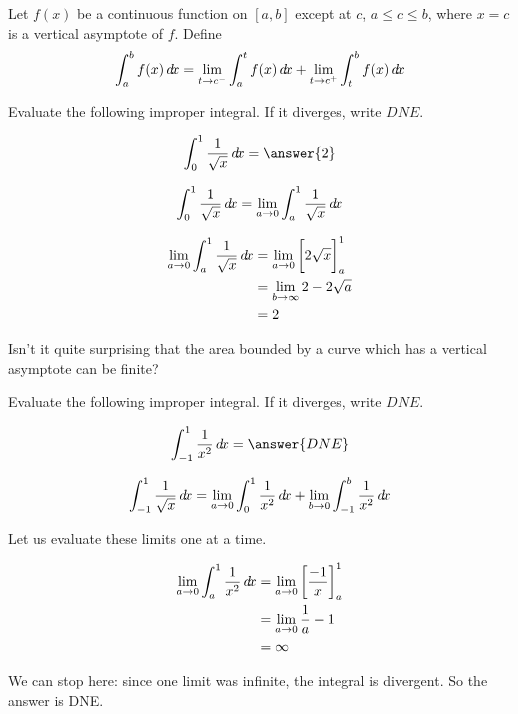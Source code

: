 \documentclass{ximera}
\begin{document}
\begin{definition}
Let $f(x)$ be a continuous function on $[a,b]$ except at $c$, $a\leq c\leq b$, where $x=c$ is a vertical asymptote of $f$. Define
\[
\int_a^b f(x)\mathop{}\!d\! x = \lim_{t\to c^-}\int_a^t f(x)\mathop{}\!d\! x + \lim_{t\to c^+}\int_t^b f(x)\mathop{}\!d\! x
\]
\end{definition}

\begin{example}	
	Evaluate the following improper integral.  If it diverges, write $DNE$.
	
	\[
	\int_{0}^1 \frac{1}{\sqrt{x}} \d x = \answer{2}
	\]
	
	\begin{hint}
		\[
		\int_{0}^1 \frac{1}{\sqrt{x}} \mathop{}\!d\! x = \lim_{a \to 0} \int_{a}^1 \frac{1}{\sqrt{x}} \mathop{}\!d\! x 
		\]
	\end{hint}
	
	\begin{hint}
		\begin{align*}
		 \lim_{a \to 0} \int_{a}^1 \frac{1}{\sqrt{x}} \mathop{}\!d\! x  &=  \lim_{a \to 0}  \bigg[ 2\sqrt{x} \bigg]_a^1 \\
		 	&=  \lim_{b \to \infty} 2-2\sqrt{a}\\
			&= 2
		\end{align*}
		\end{hint}
		
		\begin{feedback}
			Isn't it quite surprising that the area bounded by a curve which has a vertical asymptote can be finite?
		\end{feedback}
\end{example}

\begin{example}	
	Evaluate the following improper integral.  If it diverges, write $DNE$.
	
	\[
	\int_{-1}^1 \frac{1}{x^2} \d x = \answer{DNE}
	\]
	
	\begin{hint}
		\[
		\int_{-1}^1 \frac{1}{\sqrt{x}} \mathop{}\!d\! x = \lim_{a \to 0} \int_{0}^1 \frac{1}{x^2} \mathop{}\!d\! x  + \lim_{b \to 0} \int_{-1}^b \frac{1}{x^2} \mathop{}\!d\! x
		\]
	\end{hint}
	
	\begin{hint}
		Let us evaluate these limits one at a time.
		
		\begin{align*}
		 \lim_{a \to 0} \int_{a}^1 \frac{1}{x^2} \mathop{}\!d\! x  &=  \lim_{a \to 0} \bigg[ \frac{-1}{x} \bigg]_a^1 \\
		 	&=  \lim_{a \to 0} \frac{1}{a}-1\\
			&= \infty
		\end{align*}
		
		We can stop here:  since one limit was infinite, the integral is divergent.  So the answer is DNE.
		\end{hint}
\end{example}
\end{document}
